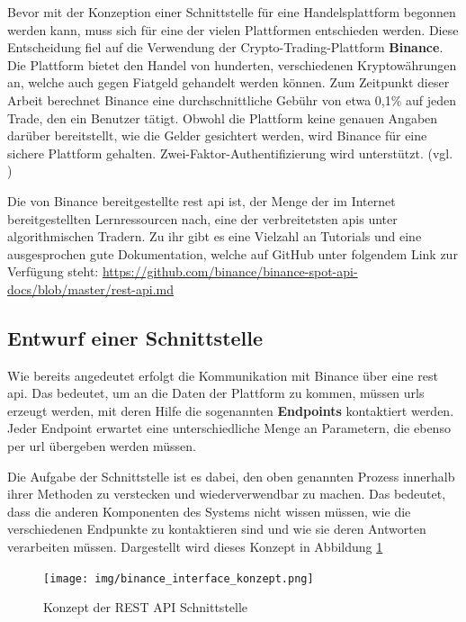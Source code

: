 \documentclass[oneside]{ausarbeitung}
\begin{document}
Bevor mit der Konzeption einer Schnittstelle für eine Handelsplattform begonnen werden kann, muss sich für eine der vielen Plattformen entschieden werden. Diese Entscheidung fiel auf die Verwendung der Crypto-Trading-Plattform \textbf{Binance}. Die Plattform bietet den Handel von hunderten, verschiedenen Kryptowährungen an, welche auch gegen Fiatgeld gehandelt werden können. Zum Zeitpunkt dieser Arbeit berechnet Binance eine durchschnittliche Gebühr von etwa 0,1\% auf jeden Trade, den ein Benutzer tätigt. Obwohl die Plattform keine genauen Angaben darüber bereitstellt, wie die Gelder gesichtert werden, wird Binance für eine sichere Plattform gehalten. Zwei-Faktor-Authentifizierung wird unterstützt. (vgl. \cite{binance})

Die von Binance bereitgestellte \ac{rest} \ac{api} ist, der Menge der im Internet bereitgestellten Lernressourcen nach, eine der verbreitetsten \ac{api}s unter algorithmischen Tradern. Zu ihr gibt es eine Vielzahl an Tutorials und eine ausgesprochen gute Dokumentation, welche auf GitHub unter folgendem Link zur Verfügung steht: \url{https://github.com/binance/binance-spot-api-docs/blob/master/rest-api.md}

\subsection{Entwurf einer Schnittstelle}
\label{sub:entwurf_einer_schnittstelle}

Wie bereits angedeutet erfolgt die Kommunikation mit Binance über eine \ac{rest} \ac{api}. Das bedeutet, um an die Daten der Plattform zu kommen, müssen \ac{url}s erzeugt werden, mit deren Hilfe die sogenannten \textbf{Endpoints} kontaktiert werden. Jeder Endpoint erwartet eine unterschiedliche Menge an Parametern, die ebenso per \ac{url} übergeben werden müssen.

Die Aufgabe der Schnittstelle ist es dabei, den oben genannten Prozess innerhalb ihrer Methoden zu verstecken und wiederverwendbar zu machen. Das bedeutet, dass die anderen Komponenten des Systems nicht wissen müssen, wie die verschiedenen Endpunkte zu kontaktieren sind und wie sie deren Antworten verarbeiten müssen. Dargestellt wird dieses Konzept in Abbildung \ref{fig:9}

\begin{figure}[H]
  \centering
  \texttt{[image: img/binance\_interface\_konzept.png]}
  \caption{Konzept der REST API Schnittstelle}
  \label{fig:9}
\end{figure}
\end{document}
